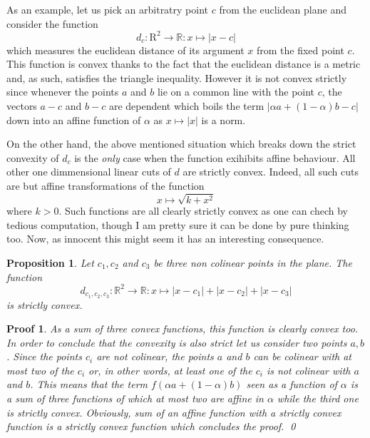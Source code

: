\documentclass[12pt]{book}
\newtheorem{proposition}{Proposition}
\newtheorem*{pf}{Proof}
\begin{document}
As an example, let us pick an arbitratry point $c$ from the euclidean plane and
    consider the function
    \begin{equation*}
        d_{c}
        \colon
        \mathrm{R}^{2}\to\mathbb{R}
        \colon
        x\mapsto |x-c|
    \end{equation*}
    which measures the euclidean distance of its argument $x$ from the fixed
    point $c$.
This function is convex thanks to the fact that the euclidean distance is a
    metric and, as such, satisfies the triangle inequality.
However it is not convex strictly since whenever the points $a$ and $b$ lie
    on a common line with the point $c$, the vectors $a-c$ and $b-c$ are
    dependent which boils the term $|\alpha a + (1-\alpha) b - c|$ down into
    an affine function of $\alpha$ as $x\mapsto |x|$ is a norm.

On the other hand, the above mentioned situation which breaks down the
    strict convexity of $d_{c}$ is the \emph{only} case when the function
    exihibits affine behaviour.
All other one dimmensional linear cuts of $d$ are strictly convex.
Indeed, all such cuts are but affine transformations of the function
    \begin{equation}
        x
        \mapsto
        \sqrt{k+x^{2}}
    \end{equation}
    where $k>0$.
Such functions are all clearly strictly convex as one can chech by tedious
    computation, though I am pretty sure it can be done by pure thinking too.
Now, as innocent this might seem it has an interesting consequence.

\begin{proposition}
    Let $c_{1},c_{2}$ and $c_{3}$ be three non colinear points in the plane.
    The function
        \begin{equation*}
            d_{c_{1},c_{2},c_{3}}
            \colon
            \mathbb{R}^{2}\to\mathbb{R}
            \colon
            x\mapsto |x-c_{1}| + |x-c_{2}| + |x - c_{3}|
        \end{equation*}
        is strictly convex.
\end{proposition}
\begin{pf}
    As a sum of three convex functions, this function is clearly convex too.
    In order to conclude that the convexity is also strict let us consider two
        points $a,b$.
    Since the points $c_{i}$ are not colinear, the points $a$ and $b$ can be
        colinear with at most two of the $c_{i}$ or, in other words, at least
        one of the $c_{i}$ is not colinear with $a$ and $b$.
    This means that the term $f(\alpha a + (1-\alpha)b)$ seen as a function
        of $\alpha$ is a sum of three functions of which at most two are
        affine in $\alpha$ while the third one is strictly convex.
    Obviously, sum of an affine function with a strictly convex function is
        a strictly convex function which concludes the proof.
    \qed
\end{pf}
\end{document}
